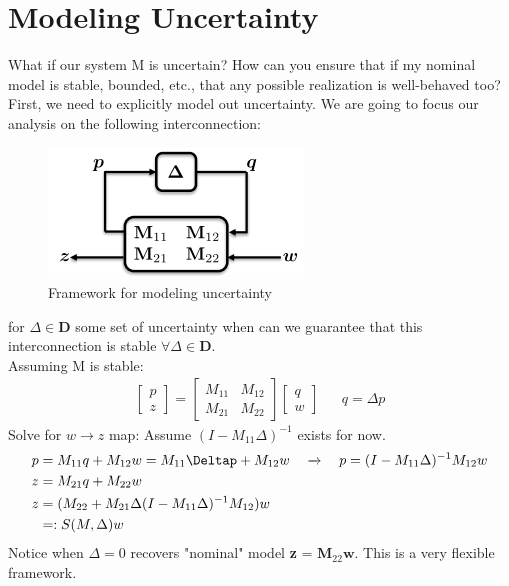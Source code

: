 \documentclass{article}[12pt]
\begin{document}
\section{Modeling Uncertainty}
What if our system M is uncertain? How can you ensure that if my nominal model is stable, bounded, etc., that any possible realization is well-behaved too? First, we need to explicitly model out uncertainty. We are going to focus our analysis on the following interconnection:
\begin{figure} [H]
    \centering
    \includegraphics[scale=.7]{figures/deltablock.png}
    \caption{Framework for modeling uncertainty}
    \label{fig:delta}
\end{figure}
for $\Delta \in \textbf{D}$ some set of uncertainty when can we guarantee that this interconnection is stable $\forall \Delta \in \textbf{D}$.\\
Assuming M is stable:
\begin{align*}
    \begin{bmatrix}p\\z\end{bmatrix} = \begin{bmatrix}M_{11} & M_{12}\\M_{21}&M_{22}\end{bmatrix}\begin{bmatrix}q\\w\end{bmatrix} && q = \Delta p
\end{align*}
Solve for $w \xrightarrow{} z$ map: Assume $(I - M_{11}\Delta)^{-1}$ exists for now.
\begin{align*}
    p &= M_{11}q + M_{12}w = M_{11}\Deltap + M_{12}w  \quad \xrightarrow{} \quad p = (I - M_{11}\Delta)^{-1}M_{12}w\\
    z &= M_{21}q + M_{22}w\\
    z &= (M_{22} + M_{21}\Delta(I - M_{11}\Delta)^{-1}M_{12})w\\
    &=: S(M,\Delta)w
\end{align*}
Notice when $\Delta=0$ recovers "nominal" model \textbf{z} = $\textbf{M}_{22}\textbf{w}$. This is a very flexible framework.
\end{document}
